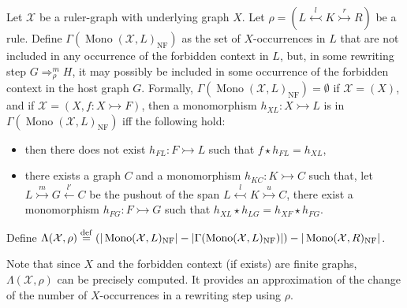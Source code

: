 \begin{definition}
    \label{def:gamma_l_rho_x}
    Let $\mathcal{X}$ be a ruler-graph with underlying graph $X$. 
    Let \( \rho = (L \overset{l}{\leftarrowtail} K \overset{r}{\rightarrowtail} R) \) be a rule.
    Define $\Gamma(\operatorname{Mono}(\mathcal{X},L)_{\operatorname{NF}})$ as the set of $X$-occurrences in $L$ that are not included in any occurrence of the forbidden context in $L$, but, in some rewriting step $G \Rightarrow_\rho^m H$, it may possibly be included in some occurrence of the forbidden context in the host graph $G$. 
    Formally,  $\Gamma(\operatorname{Mono}(\mathcal{X},L)_{\operatorname{NF}}) = \emptyset$ if $\mathcal{X} = (X)$, and if $\mathcal{X} = (X, f:X \rightarrowtail F)$, then a monomorphism $h_{XL}:X \rightarrowtail L$ is in $\Gamma(\operatorname{Mono}(\mathcal{X},L)_{\operatorname{NF}})$ iff the following hold:
    \begin{itemize}
        \item then there does not exist $h_{FL}:F \rightarrowtail L$ such that $f \star h_{FL} = h_{XL}$,
         \item there exists a graph $C$ and a monomorphism $h_{KC}:K \rightarrowtail C$ such that, let $L \overset{m}{\rightarrowtail} G \overset{l'}{\leftarrow} C$ be the pushout of the span $L \overset{l}{\leftarrowtail} K \overset{u}{\rightarrowtail} C$, there exist a monomorphism $h_{FG} : F \rightarrowtail G$ such that $h_{XL} \star h_{LG} = h_{XF} \star h_{FG}$. 
    \end{itemize}
    Define $\Lambda(\mathcal{X},\rho) \overset{\operatorname{def}}{=} (|\operatorname{Mono}(\mathcal{X},L)_{\operatorname{NF}}| - 
    |\Gamma(\operatorname{Mono}(\mathcal{X},L)_{\operatorname{NF}})|) -
   |\operatorname{Mono}(\mathcal{X},R)_{\operatorname{NF}}|$. 
\end{definition}
Note that since $X$ and the forbidden context (if exists) are finite graphs, $\Lambda(\mathcal{X},\rho)$ can be precisely computed. It provides an approximation of the change of the number of $X$-occurrences in a rewriting step using $\rho$.

